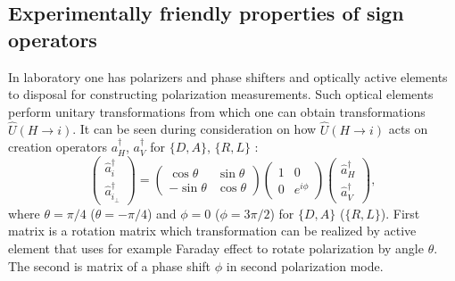 \documentclass[aps,pra, twocolumn, showpacs]{revtex4-2}
\begin{document}
\begin{appendices}
\section{Experimentally friendly properties of sign operators }\label{exper}
\setcounter{equation}{0}

In laboratory one has polarizers and phase shifters and optically active elements to disposal for constructing polarization measurements. Such optical elements perform unitary transformations from which one can obtain transformations $\hat U(H\rightarrow i)$. It can be seen during consideration on how $\hat U(H\rightarrow i)$ acts on creation operators $a^\dagger_H$, $a^\dagger_V$ for $\{D,A\}$, $\{R,L\}$ :
\begin{equation}
\left( \begin{array}{c}
\hat a_{i}^\dagger \\
\hat a_{i_\bot}^\dagger 
\end{array} \right) =
\left( \begin{array}{cc}
\cos{\theta} & \sin{\theta} \\
-\sin{\theta} &\cos{\theta}
\end{array} \right)
\left( \begin{array}{cc}
1 & 0 \\
0 & e^{i\phi}
\end{array} \right)
\left( \begin{array}{c}
\hat a_H^\dagger \\
\hat a_{V}^\dagger 
\end{array} \right),
\end{equation}
where $\theta=\pi/4$ ($\theta=-\pi/4$) and $\phi=0 $ ($\phi=3\pi/2$) for $\{D,A\}$ ($\{R,L\}$).
First matrix is a rotation matrix which transformation can be realized by active element that uses for example Faraday effect to rotate polarization by angle $\theta$.  The second is matrix of a phase shift $\phi$ in second polarization mode.


\end{appendices}
\end{document}
